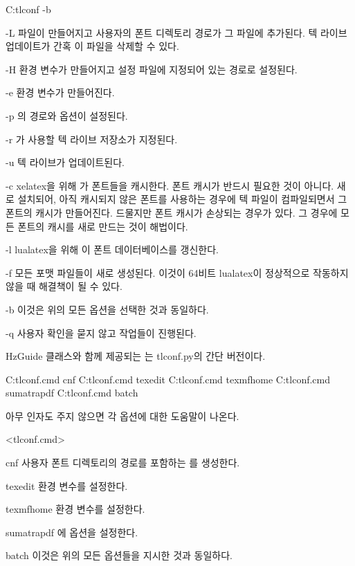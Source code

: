 \begin{code}
C:\>tlconf -b
\end{code}

\begin{macros}
\item[-L]  파일이 만들어지고 사용자의 폰트 디렉토리 경로가 그 파일에 추가된다.
텍 라이브 업데이트가 간혹 이 파일을 삭제할 수 있다.
\item[-H]  환경 변수가 만들어지고 설정 파일에 지정되어 있는 경로로 설정된다.
\item[-e]  환경 변수가 만들어진다.
\item[-p] 의 경로와  옵션이 설정된다. 
\item[-r] 가 사용할 텍 라이브 저장소가 지정된다.
\item[-u] 텍 라이브가 업데이트된다.
\item[-c] xelatex을 위해 가 폰트들을 캐시한다.
폰트 캐시가 반드시 필요한 것이 아니다.
새로 설치되어, 아직 캐시되지 않은 폰트를 사용하는 경우에 텍 파일이 컴파일되면서 그 폰트의 캐시가 만들어진다. 
드물지만 폰트 캐시가 손상되는 경우가 있다. 
그 경우에 모든 폰트의 캐시를 새로 만드는 것이 해법이다.
\item[-l] lualatex을 위해 이 폰트 데이터베이스를 갱신한다.
\item[-f] 모든 포맷 파일들이 새로 생성된다. 이것이 64비트 lualatex이 정상적으로 작동하지 않을 때 해결책이 될 수 있다.
\item[-b] 이것은 위의 모든 옵션을 선택한 것과 동일하다.
\item[-q] 사용자 확인을 묻지 않고 작업들이 진행된다.
\end{macros}

HzGuide 클래스와 함께 제공되는 는 tlconf.py의 간단 버전이다.

\begin{codewrite}
C:\>tlconf.cmd cnf
C:\>tlconf.cmd texedit
C:\>tlconf.cmd texmfhome
C:\>tlconf.cmd sumatrapdf
C:\>tlconf.cmd batch
\end{codewrite}
\coderead

아무 인자도 주지 않으면 각 옵션에 대한 도움말이 나온다.

\begin{macros}<tlconf.cmd>
\item[cnf] 사용자 폰트 디렉토리의 경로를 포함하는 를 생성한다.
\item[texedit]  환경 변수를 설정한다.
\item[texmfhome]  환경 변수를 설정한다.
\item[sumatrapdf] 에  옵션을 설정한다.
\item[batch] 이것은 위의 모든 옵션들을 지시한 것과 동일하다.
\end{macros}

